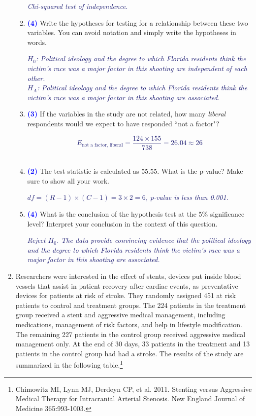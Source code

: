 \documentclass[11pt]{article}
\newcommand{\soln}[1]{\textcolor{MidnightBlue}{\textit{#1}}}	%
\newcommand{\pts}[1]{ \textbf{{\footnotesize \textcolor{blue}{(#1)}}} }	%
\begin{document}
\begin{enumerate}
\begin{enumerate}
\soln{Chi-squared test of independence.}

\item \pts{4} Write the hypotheses for testing for a relationship between these two variables. You can avoid notation and simply write the hypotheses in words.

\soln{$H_0$: Political ideology and the degree to which Florida residents think the victim's race was a major factor in this shooting are independent of each other. \\
$H_A$: Political ideology and the degree to which Florida residents think the victim's race was a major factor in this shooting are associated.
}
$\:$

\item \pts{3} If the variables in the study are not related, how many \emph{liberal} respondents would we expect to have responded ``not a factor"?

\soln{\[ E_{\text{not a factor, liberal}} = \frac{124 \times 155}{738} = 26.04 \approx 26 \]}
$\:$

\item \pts{2} The test statistic is calculated as 55.55. What is the p-value? Make sure to show all your work.

\soln{$df = (R - 1) \times (C - 1) = 3 \times 2 = 6$, p-value is less than 0.001.}

\item \pts{4} What is the conclusion of the hypothesis test at the 5\% significance level? Interpret your conclusion in the context of this question.

\soln{Reject $H_0$. The data provide convincing evidence that the political ideology and the degree to which Florida residents think the victim's race was a major factor in this shooting are associated.}

\end{enumerate}

%

\pagebreak

\item Researchers were interested in the effect of stents, devices put inside blood vessels that assist in patient recovery after cardiac events, as preventative devices for patients at risk of stroke. They randomly assigned 451 at risk patients to control and treatment groups. The 224 patients in the treatment group received a stent and aggressive medical management, including medications, management of risk factors, and help in lifestyle modification. The remaining 227 patients in the control group received aggressive medical management only. At the end of 30 days, 33 patients in the treatment and 13 patients in the control group had had a stroke. The results of the study are summarized in the following table.\footnote{Chimowitz MI, Lynn MJ, Derdeyn CP, et al. 2011. Stenting versus Aggressive Medical Therapy for Intracranial Arterial Stenosis. New England Journal of Medicine 365:993-1003.} \\


\end{enumerate}
\end{document}
